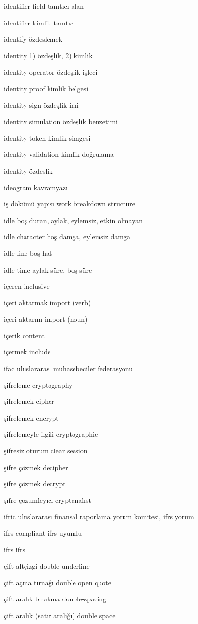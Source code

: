 \documentclass[12pt,fleqn]{article}\usepackage{../../common}
\begin{document}
identifier field tanıtıcı alan

identifier kimlik tanıtıcı

identify özdeslemek

identity 1) özdeşlik, 2) kimlik

identity operator özdeşlik işleci

identity proof kimlik belgesi

identity sign özdeşlik imi

identity simulation özdeşlik benzetimi

identity token kimlik simgesi

identity validation kimlik doğrulama

identity özdeslik

ideogram kavramyazı

iş dökümü yapısı work breakdown structure

idle boş duran, aylak, eylemsiz, etkin olmayan

idle character boş damga, eylemsiz damga

idle line boş hat

idle time aylak süre, boş süre

içeren inclusive

içeri aktarmak import (verb)

içeri aktarım import (noun)

içerik content

içermek include

ifac uluslararası muhasebeciler federasyonu

şifreleme cryptography

şifrelemek cipher

şifrelemek encrypt

şifrelemeyle ilgili cryptographic

şifresiz oturum clear session

şifre çözmek decipher

şifre çözmek decrypt

şifre çözümleyici cryptanalist

ifric uluslararası finansal raporlama yorum  komitesi, ifrs yorum

ifrs-compliant ifrs uyumlu

ifrs ifrs

çift altçizgi double underline

çift açma tırnağı double open quote

çift aralık bırakma double-spacing

çift aralık (satır aralığı) double space
\end{document}
